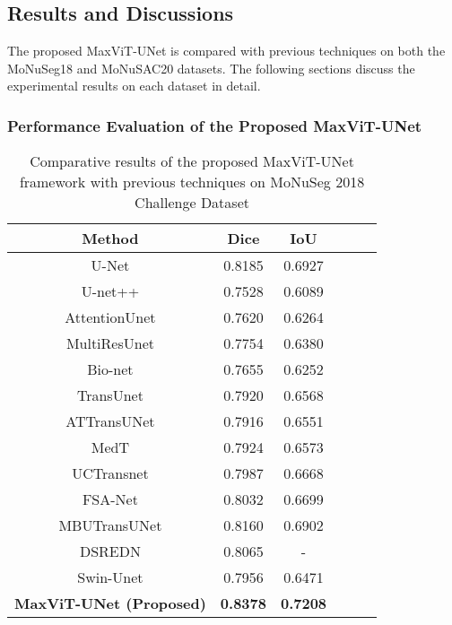 \documentclass{article}
\begin{document}
\subsection{Results and Discussions}\label{Results and Discussions}

The proposed MaxViT-UNet is compared with previous techniques on both the MoNuSeg18 and MoNuSAC20 datasets. The following sections discuss the experimental results on each dataset in detail.

\subsubsection{Performance Evaluation of the Proposed MaxViT-UNet}\label{Performance Evaluation of the Proposed MaxViT-UNet}

\begin{table}[t!]
  \centering
  \caption{Comparative results of the proposed MaxViT-UNet framework with previous techniques on MoNuSeg 2018 Challenge Dataset}\label{table:results-monuseg18}
  \begin{tabular*}{\textwidth}{@{\extracolsep\fill}cccccc}
    \toprule Method & Dice & IoU  \\ \hline
      U-Net \cite{ronneberger2015u} & 0.8185 & 0.6927 \\
      U-net++ \cite{zhou2019unet++} & 0.7528 & 0.6089 \\
      AttentionUnet \cite{oktay2018attention} & 0.7620 & 0.6264 \\
      MultiResUnet \cite{ibtehaz2020multiresunet} & 0.7754 & 0.6380 \\
      Bio-net \cite{xiang2020bio} & 0.7655 & 0.6252 \\
      TransUnet \cite{chen2021transunet} & 0.7920 & 0.6568 \\
      ATTransUNet \cite{li2023attransunet} & 0.7916 & 0.6551 \\
      MedT \cite{valanarasu2021medical} & 0.7924 & 0.6573 \\
      UCTransnet \cite{wang2022uctransnet} & 0.7987 & 0.6668 \\
      FSA-Net \cite{zhan2023fsa} & 0.8032 & 0.6699 \\
      MBUTransUNet \cite{qiao2023mbutransnet} & 0.8160 & 0.6902 \\
      DSREDN \cite{chanchal2022deep} & 0.8065 & - \\
      Swin-Unet \cite{cao2022swin} & 0.7956 & 0.6471 \\
      \textbf{MaxViT-UNet (Proposed)} & \textbf{0.8378} & \textbf{0.7208} \\
    \hline
  \end{tabular*}
\end{table}
\end{document}
